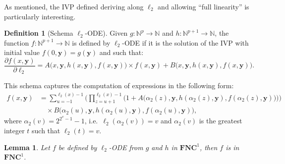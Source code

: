 \documentclass[11pt, oneside]{article}
\newcommand{\Nat}{\mathbb{N}}
\newcommand{\NC}{\mathbf{FNC}}
\newcommand{\tu}[1]{\mathbf{#1}}
\newtheorem{lemma}{Lemma}
\theoremstyle{definition}
\newtheorem{defn}{Definition}
\newcommand{\pODE}{\ell\text{-pODE}}
\begin{document}
As mentioned, the IVP defined deriving along $\ell_2$ and allowing ``full linearity'' is particularly interesting.
%



\begin{defn}[Schema $\ell_2$-ODE]
    Given $g:\Nat^p \to \Nat$ and $h:\Nat^{p+1} \to \Nat$, the function $f:\Nat^{p+1} \to \Nat$ is defined by $\ell_2$-ODE if it is the solution of the IVP with initial value $f(0, \tu y)=g(\tu y)$ and such that:
    $$
    \frac{\partial f(x, \tu y)}{\partial \ell_2} = A\big(x, \tu y, h(x, \tu y), f(x, \tu y)\big) \times f(x, \tu y) + B\big(x, \tu y, h(x, \tu y), f(x, \tu y)\big).
    $$
\end{defn}
\noindent
This schema  captures the computation of expressions in the following form:
\begin{align*}
    f(x, \tu y) &= \sum^{\ell_2(x)-1}_{u=-1} \Bigg(\prod^{\ell_2(x)-1}_{z=u+1} \bigg(1+A\Big(\alpha_2(z), \tu y, h(\alpha_2(z), \tu y), f(\alpha_2(z), \tu y)\Big)\bigg) \Bigg) \\
    &\quad \times B\Big(\alpha_2(u), \tu y, h(\alpha_2(u), \tu y), f(\alpha_2(u), \tu y)\Big),
\end{align*}
where $\alpha_2(v)=2^{2^v-1}-1$, i.e.~$\ell_2(\alpha_2(v))=v$ and $\alpha_2(v)$ is the greatest integer $t$ such that $\ell_2(t)=v$.


\begin{lemma}\label{lemma:lTwoODE}
    Let $f$ be defined by $\ell_2$-ODE from $g$ and $h$ in $\NC^1$, 
    then $f$ is in $\NC^1$. %
\end{lemma}

%
\end{document}
